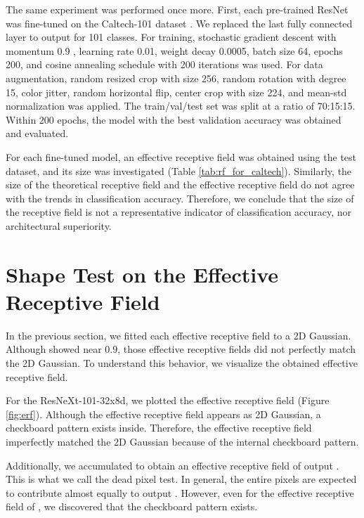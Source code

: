 \documentclass[letterpaper]{article} \usepackage{aaai22}  \usepackage{times}  \usepackage{helvet}  \usepackage{courier}  \usepackage[hyphens]{url}  \usepackage{graphicx} \urlstyle{rm} \def\UrlFont{\rm}  \usepackage{natbib}  \usepackage{caption} \DeclareCaptionStyle{ruled}{labelfont=normalfont,labelsep=colon,strut=off} \frenchspacing  \setlength{\pdfpagewidth}{8.5in}  \setlength{\pdfpageheight}{11in}  \usepackage{algorithm}
\begin{document}
The same experiment was performed once more. First, each pre-trained ResNet was fine-tuned on the Caltech-101 dataset \cite{fei2004learning}. We replaced the last fully connected layer to output for 101 classes. For training, stochastic gradient descent with momentum 0.9 \cite{sutskever2013importance}, learning rate 0.01, weight decay 0.0005, batch size 64, epochs 200, and cosine annealing schedule with 200 iterations \cite{loshchilov2016sgdr} was used. For data augmentation, random resized crop with size 256, random rotation with degree 15, color jitter, random horizontal flip, center crop with size 224, and mean-std normalization was applied. The train/val/test set was split at a ratio of 70:15:15. Within 200 epochs, the model with the best validation accuracy was obtained and evaluated.

For each fine-tuned model, an effective receptive field was obtained using the test dataset, and its size was investigated (Table \ref{tab:rf_for_caltech}). Similarly, the size of the theoretical receptive field and the effective receptive field do not agree with the trends in classification accuracy.  Therefore, we conclude that the size of the receptive field is not a representative indicator of classification accuracy, nor architectural superiority.

\section{Shape Test on the Effective Receptive Field}
\label{sec:Shape_Test_on_the_Effective_Receptive_Field}

In the previous section, we fitted each effective receptive field to a 2D Gaussian. Although  showed near 0.9, those effective receptive fields did not perfectly match the 2D Gaussian. To understand this behavior, we visualize the obtained effective receptive field.

For the ResNeXt-101-32x8d, we plotted the effective receptive field (Figure \ref{fig:erf}). Although the effective receptive field appears as 2D Gaussian, a checkboard pattern exists inside. Therefore, the effective receptive field imperfectly matched the 2D Gaussian because of the internal checkboard pattern.

Additionally, we accumulated  to obtain an effective receptive field of output . This is what we call the dead pixel test. In general, the entire pixels are expected to contribute almost equally to output . However, even for the effective receptive field of , we discovered that the checkboard pattern exists.
\end{document}
